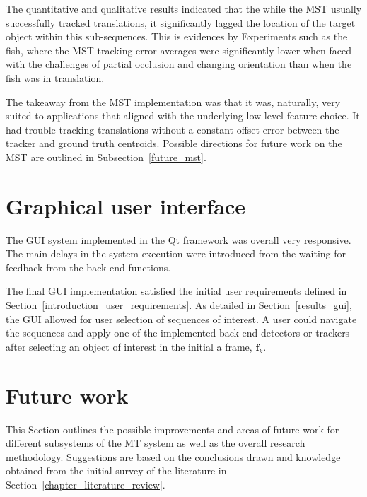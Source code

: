 The quantitative and qualitative results indicated that the while the MST
usually successfully tracked translations, it significantly
lagged the location of the target object within this sub-sequences. This is
evidences by Experiments such as the fish, where the MST tracking error averages
were significantly lower when faced with the challenges of partial occlusion and
changing orientation than when the fish was in translation.

The takeaway from the MST implementation was that it was, naturally, very suited to
applications that aligned with the underlying low-level feature choice. It had
trouble tracking translations without a constant offset error between the
tracker and ground truth centroids. Possible directions for future work on the
MST are outlined in Subsection~\ref{future_mst}.

\section{Graphical user interface}
The GUI system implemented in the Qt framework was overall very responsive. The
main delays in the system execution were introduced from the waiting for
feedback from the back-end functions.

The final GUI implementation satisfied the initial user requirements defined in
Section~\ref{introduction_user_requirements}. As detailed in
Section~\ref{results_gui}, the GUI allowed for user selection of sequences of
interest. A user could navigate the sequences and apply one of the implemented
back-end detectors or trackers after selecting an object of interest in the
initial a frame, $\mathbf{f}_k$.


\section{Future work}\label{future}
This Section outlines the possible improvements and areas
of future work for different subsystems of the MT system as well as the overall
research methodology. Suggestions are based
on the conclusions drawn and knowledge obtained from the initial survey of the
literature in Section~\ref{chapter_literature_review}.

